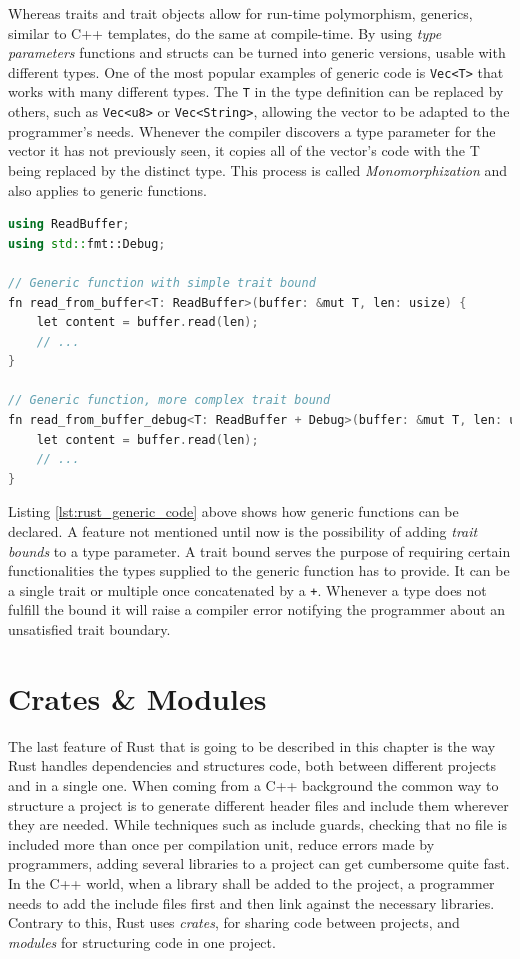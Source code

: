 Whereas traits and trait objects allow for run-time polymorphism, generics, similar to C++ templates, do the same at compile-time. By using \textit{type parameters} functions and structs can be turned into generic versions, usable with different types. One of the most popular examples of generic code is \texttt{Vec<T>} that works with many different types. The \texttt{T} in the type definition can be replaced by others, such as \texttt{Vec<u8>} or \texttt{Vec<String>}, allowing the vector to be adapted to the programmer's needs. Whenever the compiler discovers a type parameter for the vector it has not previously seen, it copies all of the vector's code with the T being replaced by the distinct type. This process is called \textit{Monomorphization} and also applies to generic functions. \cite{monomorph} \\

\begin{lstlisting}[caption={A generic function in Rust showcasing trait bounds}, label={lst:rust_generic_code}, language=C++]
using ReadBuffer;
using std::fmt::Debug;

// Generic function with simple trait bound
fn read_from_buffer<T: ReadBuffer>(buffer: &mut T, len: usize) {
	let content = buffer.read(len);
	// ...
}

// Generic function, more complex trait bound
fn read_from_buffer_debug<T: ReadBuffer + Debug>(buffer: &mut T, len: usize) {
	let content = buffer.read(len);
	// ...
}
\end{lstlisting}

\noindent
Listing \ref{lst:rust_generic_code} above shows how generic functions can be declared. A feature not mentioned until now is the possibility of adding \textit{trait bounds} to a type parameter. A trait bound serves the purpose of requiring certain functionalities the types supplied to the generic function has to provide. It can be a single trait or multiple once concatenated by a \texttt{+}. Whenever a type does not fulfill the bound it will raise a compiler error notifying the programmer about an unsatisfied trait boundary.

\section{Crates \& Modules}

The last feature of Rust that is going to be described in this chapter is the way Rust handles dependencies and structures code, both between different projects and in a single one. When coming from a C++ background the common way to structure a project is to generate different header files and include them wherever they are needed. While techniques such as include guards, checking that no file is included more than once per compilation unit, reduce errors made by programmers, adding several libraries to a project can get cumbersome quite fast. In the C++ world, when a library shall be added to the project, a programmer needs to add the include files first and then link against the necessary libraries. Contrary to this, Rust uses \textit{crates}, for sharing code between projects, and \textit{modules} for structuring code in one project. 

